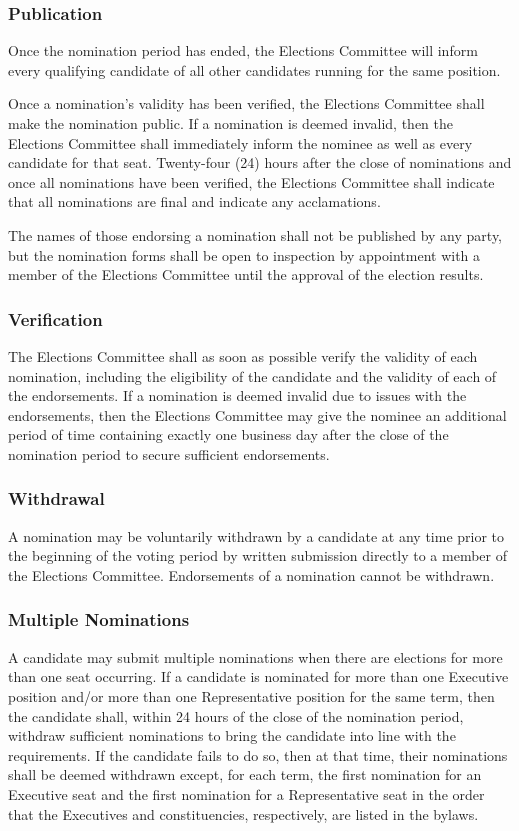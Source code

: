 \subsubsection{Publication}
Once the nomination period has ended, the Elections Committee will inform every qualifying candidate of all other candidates running for the same position.

Once a nomination's validity has been verified, the Elections Committee shall make the nomination public.
If a nomination is deemed invalid, then the Elections Committee shall immediately inform the nominee as well as every candidate for that seat.
Twenty-four (24) hours after the close of nominations and once all nominations have been verified, the Elections Committee shall indicate that all nominations are final and indicate any acclamations.

The names of those endorsing a nomination shall not be published by any party, but the nomination forms shall be open to inspection by appointment with a member of the Elections Committee until the approval of the election results.

\subsubsection{Verification}
The Elections Committee shall as soon as possible verify the validity of each nomination, including the eligibility of the candidate and the validity of each of the endorsements.
If a nomination is deemed invalid due to issues with the endorsements, then the Elections Committee may give the nominee an additional period of time containing exactly one business day after the close of the nomination period to secure sufficient endorsements.

\subsubsection{Withdrawal}
A nomination may be voluntarily withdrawn by a candidate at any time prior to the beginning of the voting period by written submission directly to a member of the Elections Committee.
Endorsements of a nomination cannot be withdrawn.

\subsubsection{Multiple Nominations}
A candidate may submit multiple nominations when there are elections for more than one seat occurring.
If a candidate is nominated for more than one Executive position and/or more than one Representative position for the same term, then the candidate shall, within 24 hours of the close of the nomination period, withdraw sufficient nominations to bring the candidate into line with the requirements.
If the candidate fails to do so, then at that time, their nominations shall be deemed withdrawn except, for each term, the first
nomination for an Executive seat and the first nomination for a Representative seat in the order that the Executives and constituencies, respectively, are listed in the bylaws.

